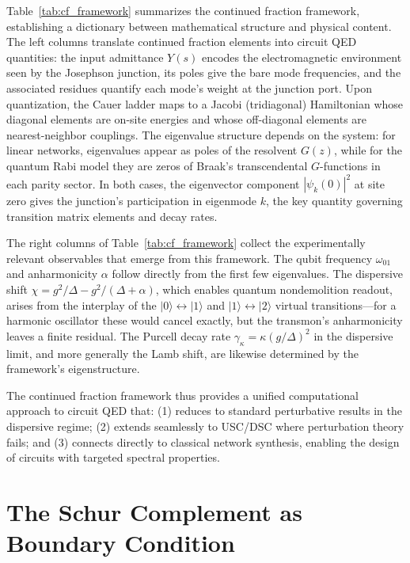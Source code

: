 \documentclass[reprint, floatfix, superscriptaddress, amsmath, amssymb, longbibliography]{revtex4-2}
\begin{document}
Table~\ref{tab:cf_framework} summarizes the continued fraction framework, establishing a dictionary between mathematical structure and physical content. The left columns translate continued fraction elements into circuit QED quantities: the input admittance $Y(s)$ encodes the electromagnetic environment seen by the Josephson junction, its poles give the bare mode frequencies, and the associated residues quantify each mode's weight at the junction port. Upon quantization, the Cauer ladder maps to a Jacobi (tridiagonal) Hamiltonian whose diagonal elements are on-site energies and whose off-diagonal elements are nearest-neighbor couplings. The eigenvalue structure depends on the system: for linear networks, eigenvalues appear as poles of the resolvent $G(z)$, while for the quantum Rabi model they are zeros of Braak's transcendental $G$-functions in each parity sector. In both cases, the eigenvector component $|\psi_k(0)|^2$ at site zero gives the junction's participation in eigenmode $k$, the key quantity governing transition matrix elements and decay rates. 

The right columns of Table~\ref{tab:cf_framework} collect the experimentally relevant observables that emerge from this framework. The qubit frequency $\omega_{01}$ and anharmonicity $\alpha$ follow directly from the first few eigenvalues. The dispersive shift $\chi = g^2/\Delta - g^2/(\Delta+\alpha)$, which enables quantum nondemolition readout, arises from the interplay of the $|0\rangle \leftrightarrow |1\rangle$ and $|1\rangle \leftrightarrow |2\rangle$ virtual transitions---for a harmonic oscillator these would cancel exactly, but the transmon's anharmonicity leaves a finite residual. The Purcell decay rate $\gamma_\kappa = \kappa(g/\Delta)^2$ in the dispersive limit, and more generally the Lamb shift, are likewise determined by the framework's eigenstructure. 

The continued fraction framework thus provides a unified computational approach to circuit QED that: (1) reduces to standard perturbative results in the dispersive regime; (2) extends seamlessly to USC/DSC where perturbation theory fails; and (3) connects directly to classical network synthesis, enabling the design of circuits with targeted spectral properties.


\section{The Schur Complement as Boundary Condition}
\label{sec:schur}
\end{document}
